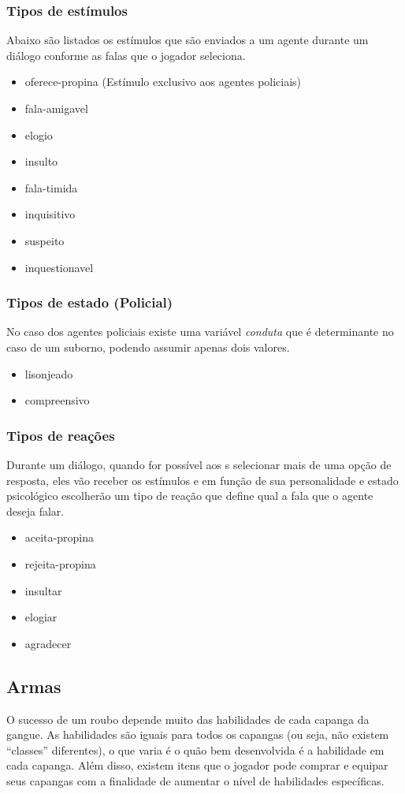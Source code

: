 \subsubsection{Tipos de estímulos}
Abaixo são listados os estímulos que são enviados a um agente durante um diálogo conforme as falas que o jogador seleciona.
\begin{itemize}
\item oferece-propina (Estímulo exclusivo aos agentes policiais)
\item fala-amigavel
\item elogio
\item insulto
\item fala-timida
\item inquisitivo
\item suspeito
\item inquestionavel
\end{itemize}

\subsubsection{Tipos de estado (Policial)}
No caso dos agentes policiais existe uma variável \emph{conduta} que é determinante no caso de um suborno, podendo assumir apenas dois valores.
\begin{itemize}
\item lisonjeado
\item compreensivo
\end{itemize}

\subsubsection{Tipos de reações}
Durante um diálogo, quando for possível aos \npc{}s selecionar mais de uma opção de resposta, eles vão receber os estímulos e em função de sua personalidade e estado psicológico escolherão um tipo de reação que define qual a fala que o agente deseja falar.
\begin{itemize}
\item aceita-propina
\item rejeita-propina
\item insultar
\item elogiar
\item agradecer
\end{itemize}


\subsection{Armas}
O sucesso de um roubo depende muito das habilidades de cada capanga da gangue. As habilidades são iguais para todos os capangas (ou seja, não existem ``classes'' diferentes), o que varia é o quão bem desenvolvida é a habilidade em cada capanga. Além disso, existem itens que o jogador pode comprar e equipar seus capangas com a finalidade de aumentar o nível de habilidades específicas.

